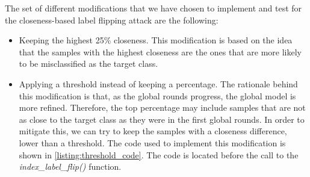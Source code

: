 The set of different modifications that we have chosen to implement and test for the closeness-based label flipping attack are the following:
\begin{itemize}
        \item Keeping the highest 25\% closeness. This modification is based on the idea that the samples with the highest closeness are the ones that are more likely to be misclassified as the target class.
        \item Applying a threshold instead of keeping a percentage. The rationale behind this modification is that, as the global rounds progress, the global model is more refined. Therefore, the top percentage may include samples that are not as close to the target class as they were in the first global rounds. In order to mitigate this, we can try to keep the samples with a closeness difference, lower than a threshold. The code used to implement this modification is shown in \autoref{listing:threshold_code}. The code is located before the call to the \textit{index\_label\_flip()} function.
\end{itemize}

